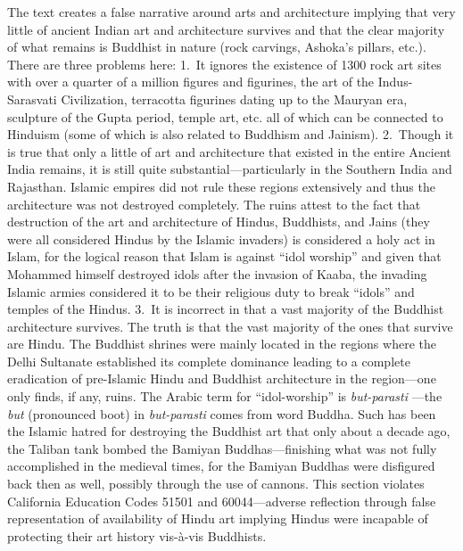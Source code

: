 The text creates a false narrative around arts and architecture implying that very little of ancient Indian art and architecture survives and that the clear majority of what remains is Buddhist in nature (rock carvings, Ashoka’s pillars, etc.). There are three problems here: 1.\ It ignores the existence of 1300 rock art sites with over a quarter of a million figures and figurines, the art of the Indus-Sarasvati Civilization, terracotta figurines dating up to the Mauryan era, sculpture of the Gupta period, temple art, etc. all of which can be connected to Hinduism (some of which is also related to Buddhism and Jainism). 2.\ Though it is true that only a little of art and architecture that existed in the entire Ancient India remains, it is still quite substantial—particularly in the Southern India and Rajasthan. Islamic empires did not rule these regions extensively and thus the architecture was not destroyed completely. The ruins attest to the fact that destruction of the art and architecture of Hindus, Buddhists, and Jains (they were all considered Hindus by the Islamic invaders) is considered a holy act in Islam, for the logical reason that Islam is against “idol worship” and given that Mohammed himself destroyed idols after the invasion of Kaaba, the invading Islamic armies considered it to be their religious duty to break “idols” and temples of the Hindus. 3.\ It is incorrect in that a vast majority of the Buddhist architecture survives. The truth is that the vast majority of the ones that survive are Hindu. The Buddhist shrines were mainly located in the regions where the Delhi Sultanate established its complete dominance leading to a complete eradication of pre-Islamic Hindu and Buddhist architecture in the region—one only finds, if any, ruins. The Arabic term for “idol-worship” is \textit{but-parasti} —the \textit{but}  (pronounced boot) in \textit{but-parasti}  comes from word Buddha. Such has been the Islamic hatred for destroying the Buddhist art that only about a decade ago, the Taliban tank bombed the Bamiyan Buddhas—finishing what was not fully accomplished in the medieval times, for the Bamiyan Buddhas were disfigured back then as well, possibly through the use of cannons. This section violates California Education Codes 51501 and 60044—adverse reflection through false representation of availability of Hindu art implying Hindus were incapable of protecting their art history vis-à-vis Buddhists.
\eject

